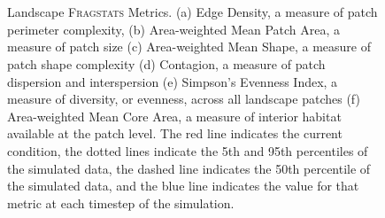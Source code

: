 \begin{figure}[!htbp]
  \centering
   \\
   \\
\caption{Landscape \textsc{Fragstats} Metrics. (a) Edge Density, a measure of patch perimeter complexity, (b) Area-weighted Mean Patch Area, a measure of patch size (c) Area-weighted Mean Shape, a measure of patch shape complexity (d) Contagion, a measure of patch dispersion and interspersion (e) Simpson's Evenness Index, a measure of diversity, or evenness, across all landscape patches (f) Area-weighted Mean Core Area, a measure of interior habitat available at the patch level. The red line indicates the current condition, the dotted lines indicate the 5th and 95th percentiles of the simulated data, the dashed line indicates the 50th percentile of the simulated data, and the blue line indicates the value for that metric at each timestep of the simulation.}
\label{fig:fragland}
\end{figure}


